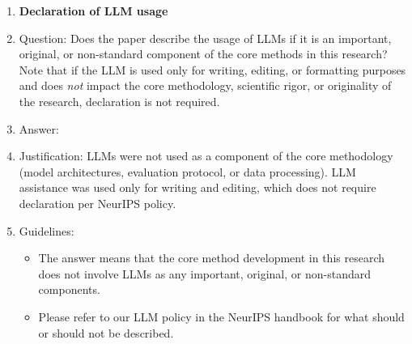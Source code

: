 \begin{enumerate}
\item {\bf Declaration of LLM usage}
    \item[] Question: Does the paper describe the usage of LLMs if it is an important, original, or non-standard component of the core methods in this research? Note that if the LLM is used only for writing, editing, or formatting purposes and does \emph{not} impact the core methodology, scientific rigor, or originality of the research, declaration is not required.
    \item[] Answer: \answerNA{}
    \item[] Justification: LLMs were not used as a component of
      the core methodology (model architectures, evaluation protocol,
      or data processing).  LLM assistance was used only for
      writing and editing, which does not require declaration per
      NeurIPS policy.
    \item[] Guidelines:
    \begin{itemize}
        \item The answer \answerNA{} means that the core method development in this research does not involve LLMs as any important, original, or non-standard components.
        \item Please refer to our LLM policy in the NeurIPS handbook for what should or should not be described.
    \end{itemize}

\end{enumerate}